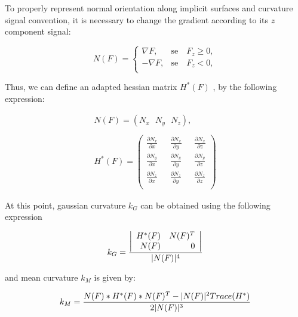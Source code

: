 \documentclass[conference]{IEEEtran}
\begin{document}
To properly represent normal orientation along implicit surfaces and curvature signal convention, it is necessary to change the gradient according to its $z$ component signal:

\begin{equation}
N(F)=\left\{\begin{array}{rc}
\nabla{F},&\mbox{se}\quad F_z\ge 0,\\
-\nabla{F},&\mbox{se}\quad F_z < 0,\\
\end{array}\right.
\end{equation}

Thus, we can define an adapted hessian matrix $H^*(F)$ \cite{martinsthesis}, by the following expression:

\begin{equation} \label{eq:novo}
\begin{array}{cc}
N(F) = (N_x \mbox{ } N_y \mbox{ } N_z),\\\\
H^*(F) = \left(\begin{array}{rrr} \frac{\partial N_x}{\partial x} \mbox{  } &  \frac{\partial N_x}{\partial y} \mbox{  } & \frac{\partial N_x}{\partial z}\\
				\frac{\partial N_y}{\partial x} \mbox{  } &  \frac{\partial N_y}{\partial y} \mbox{  } & \frac{\partial N_y}{\partial z}\\
				\frac{\partial N_z}{\partial x} \mbox{  } &  \frac{\partial N_z}{\partial y} \mbox{  } & \frac{\partial N_z}{\partial z}\\ \end{array} \right)
\end{array}
\end{equation}


At this point, gaussian curvature $k_G$ can be obtained using the following expression

\begin{equation}\label{eq:kG}
k_G =  \frac{ \left|\begin{array}{rr} H^*(F) & N(F)^T \\ N(F) & 0 \end{array} \right|} {|N(F)|^4}
\\
\end{equation}

and mean curvature $k_M$ is given by:

\begin{equation}\label{eq:kM}
k_M =  \frac{ N(F) * H^*(F) * N(F)^T - |N(F)|^2Trace(H^*)} {2|N(F)|^3}
\\
\end{equation}
\end{document}
